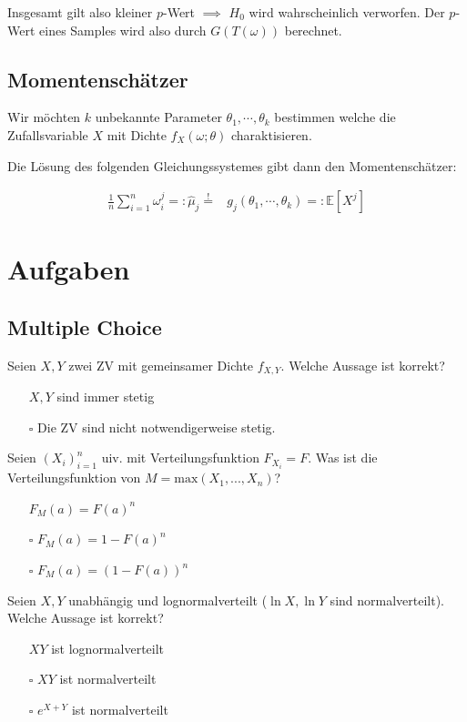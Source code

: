 \documentclass[a4paper,10pt]{article}
\def\E{\mathbb{E}}
\begin{document}
Insgesamt gilt also kleiner $p$-Wert $\implies$ $H_0$ wird wahrscheinlich verworfen. Der $p$-Wert eines Samples wird also durch $G(T(\omega))$ berechnet.

\subsection{Momentenschätzer}

Wir möchten $k$ unbekannte Parameter $\theta_1, \cdots, \theta_k$ bestimmen welche die Zufallsvariable $X$ mit Dichte $f_X(\omega; \theta)$ charaktisieren.

Die Lösung des folgenden Gleichungssystemes gibt dann den Momentenschätzer:

\begin{align*}
	\frac{1}{n} \sum_{i=1}^n \omega_i^j =: \hat{\mu}_j \overset{!}{=} & g_j(\theta_1, \cdots, \theta_k) =: \E[X^j]
\end{align*}

\section{Aufgaben}
\subsection{Multiple Choice}

Seien \(X,Y\) zwei ZV mit gemeinsamer Dichte \(f_{X,Y}\). Welche Aussage ist korrekt?
\begin{itemize}
	\item[\checkmark] \(X,Y\) sind immer stetig
	\item[\(\square\)] Die ZV sind nicht notwendigerweise stetig.
\end{itemize}

\noindent
Seien \((X_i)_{i = 1}^n\) uiv. mit Verteilungsfunktion \(F_{X_i} = F\). Was ist die Verteilungsfunktion von \(M = \text{max}(X_1,...,X_n)\)?
\begin{itemize}
	\item[\checkmark] \(F_M(a) = F(a)^n\)
	\item[\(\square\)] \(F_M(a) = 1 - F(a)^n\)
	\item[\(\square\)] \(F_M(a) = (1 - F(a))^n\)
\end{itemize}

\noindent
Seien \(X, Y\) unabhängig und lognormalverteilt (\(\ln X, \ln Y\) sind normalverteilt). Welche Aussage ist korrekt?
\begin{itemize}
	\item[\checkmark] \(XY\) ist lognormalverteilt
	\item[\(\square\)] \(XY\) ist normalverteilt
	\item[\(\square\)] \(e^{X + Y}\) ist normalverteilt
\end{itemize}
\end{document}
